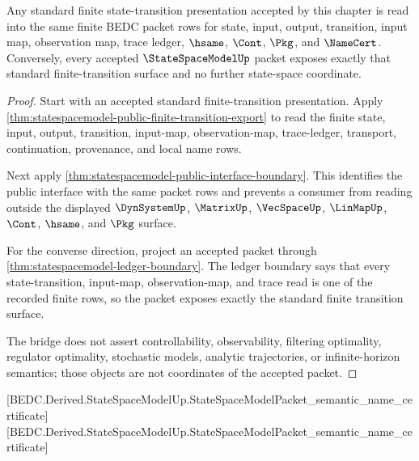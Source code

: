 \begin{theorem}
\label{thm:statespacemodel-standard-finite-transition-bridge}
Any standard finite state-transition presentation accepted by this chapter is
read into the same finite BEDC packet rows for state, input, output,
transition, input map, observation map, trace ledger, $\hsame$, $\Cont$,
$\Pkg$, and $\NameCert$. Conversely, every accepted $\StateSpaceModelUp$
packet exposes exactly that standard finite-transition surface and no further
state-space coordinate.
\end{theorem}
\begin{proof}
Start with an accepted standard finite-transition presentation. Apply
\autoref{thm:statespacemodel-public-finite-transition-export} to read the
finite state, input, output, transition, input-map, observation-map,
trace-ledger, transport, continuation, provenance, and local name rows.

Next apply \autoref{thm:statespacemodel-public-interface-boundary}. This
identifies the public interface with the same packet rows and prevents a
consumer from reading outside the displayed $\DynSystemUp$, $\MatrixUp$,
$\VecSpaceUp$, $\LinMapUp$, $\Cont$, $\hsame$, and $\Pkg$ surface.

For the converse direction, project an accepted packet through
\autoref{thm:statespacemodel-ledger-boundary}. The ledger boundary says that
every state-transition, input-map, observation-map, and trace read is one of
the recorded finite rows, so the packet exposes exactly the standard finite
transition surface.

The bridge does not assert controllability, observability, filtering
optimality, regulator optimality, stochastic models, analytic trajectories, or
infinite-horizon semantics; those objects are not coordinates of the accepted
packet.
\end{proof}

[BEDC.Derived.StateSpaceModelUp.StateSpaceModelPacket\_semantic\_name\_certificate]
[BEDC.Derived.StateSpaceModelUp.StateSpaceModelPacket\_semantic\_name\_certificate]

